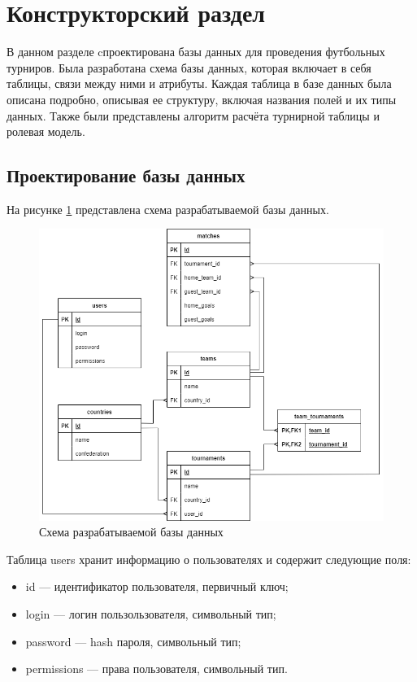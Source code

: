 \section{Конструкторский раздел}
В данном разделе cпроектирована базы данных для проведения футбольных турниров. Была разработана схема базы данных, которая включает в себя таблицы, связи между ними и атрибуты. Каждая таблица в базе данных была описана подробно, описывая ее структуру, включая названия полей и их типы данных. Также были представлены алгоритм расчёта турнирной таблицы и ролевая модель.
\subsection{Проектирование базы данных}
На рисунке \ref{img:db} представлена схема разрабатываемой базы данных.

\begin{figure}
  \centering
  \includegraphics[scale=0.5]{inc/db}
  \caption{Схема разрабатываемой базы данных}
  \label{img:db}
\end{figure}

Таблица users хранит информацию о пользователях и содержит следующие поля:
\begin{itemize}
    \item id --- идентификатор пользователя, первичный ключ; 
    \item login --- логин пользользователя, символьный тип;
    \item password --- hash пароля, символьный тип;
    \item permissions --- права пользователя, символьный тип.
\end{itemize}


